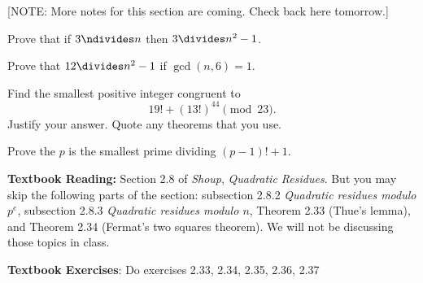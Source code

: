 \documentclass[oneside,12pt]{amsart}
\begin{document}
[NOTE: More notes for this section are coming. Check back here tomorrow.]

\bigskip

\begin{homework} 
Prove that if $3\ndivides n$ then $3\divides n^2 -1$.
\end{homework}

\begin{homework}
Prove that $12 \divides n^2 -1$ if $\gcd(n,6) = 1$.
\end{homework}

\begin{homework}
Find the smallest positive integer congruent to
$$19! + (13!)^{44} \pmod{23}.$$
Justify your answer. Quote any theorems that you use.
\end{homework}

\begin{homework}
Prove the $p$ is the smallest prime dividing $(p-1)! + 1$.
\end{homework}

\bigskip

\textbf{Textbook Reading:} Section 2.8 of \emph{Shoup}, \emph{Quadratic Residues}. But you may skip the following parts of the section:
subsection 2.8.2 \emph{Quadratic residues modulo $p^e$}, subsection 2.8.3 \emph{Quadratic residues modulo $n$}, Theorem 2.33 (Thue's lemma),
and Theorem 2.34 (Fermat's two squares theorem). We will not be discussing those topics in class.

\textbf{Textbook Exercises}: Do exercises 2.33, 2.34, 2.35, 2.36, 2.37





\end{document}
